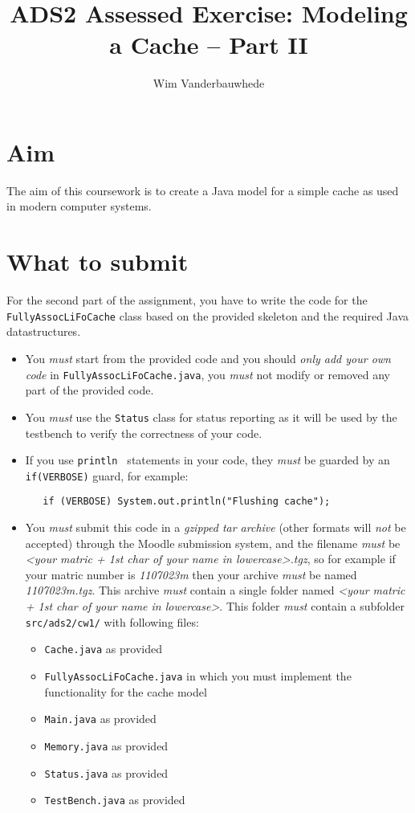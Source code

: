 \documentclass[11pt]{article}
\title{ADS2 Assessed Exercise: Modeling a Cache -- Part II}
\author{Wim Vanderbauwhede}
\date{\vspace{-5ex}}                                           %
\begin{document}
\maketitle

\section{Aim}\label{aim}

The aim of this coursework is to create a Java model for a simple cache as used in modern computer systems.

\section{What to submit}\label{what-to-submit}

For the second part of the assignment, you have to write the code for the \texttt{FullyAssocLiFoCache} class based on the provided skeleton and the required Java datastructures.
\begin{itemize}
\item You \emph{must} start from the provided code and you should \emph{only add your own code} in \texttt{FullyAssocLiFoCache.java}, you \emph{must} not modify or removed any part of the provided code. 
\item You \emph{must} use the \texttt{Status} class for status reporting as it will be used by the testbench to verify the correctness of your code.
\item If you use \texttt{println } statements in your code, they \emph{must} be guarded by an \texttt{if(VERBOSE)} guard, for example:
\begin{verbatim}
   if (VERBOSE) System.out.println("Flushing cache");
\end{verbatim}

\item You \emph{must} submit this code in a \emph{gzipped tar archive} (other formats will \emph{not} be accepted) through
the Moodle submission system, and the filename \emph{must} be
\emph{\textless{}your matric + 1st char of your name in lowercase\textgreater{}.tgz}, so for example if your matric number is \emph{1107023m}
then your archive \emph{must} be named \emph{1107023m.tgz}. This archive
\emph{must} contain a single folder named \emph{\textless{}your matric + 1st char of your name in lowercase\textgreater{}}. This folder
\emph{must} contain a subfolder \texttt{src/ads2/cw1/} with following files:
\begin{itemize}
\item \texttt{Cache.java} as provided
\item \texttt{FullyAssocLiFoCache.java}  in which you must implement the functionality for the cache model
\item \texttt{Main.java} as provided
\item \texttt{Memory.java} as provided
\item \texttt{Status.java} as provided
\item \texttt{TestBench.java} as provided
\end{itemize}
\end{itemize}
\end{document}
